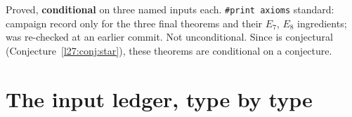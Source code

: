 \begin{status}
Proved, \textbf{conditional} on three named inputs each. \texttt{\#print axioms} standard: campaign record only for the three final
theorems and their $E_7$, $E_8$ ingredients;  was re-checked at an earlier commit. Not
unconditional. Since  is conjectural (Conjecture~\ref{l27:conj:star}), these theorems are conditional on a conjecture.
\end{status}

\section{The input ledger, type by type}\label{l27:sec:ledger}


